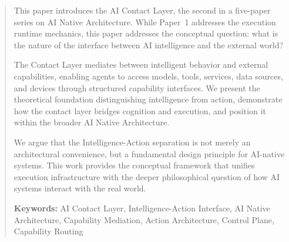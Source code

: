 \begin{abstract}
This paper introduces the AI Contact Layer, the second in a five-paper series on AI Native Architecture. While Paper~1 addresses the execution runtime mechanics, this paper addresses the conceptual question: what is the nature of the interface between AI intelligence and the external world?

The Contact Layer mediates between intelligent behavior and external capabilities, enabling agents to access models, tools, services, data sources, and devices through structured capability interfaces. We present the theoretical foundation distinguishing intelligence from action, demonstrate how the contact layer bridges cognition and execution, and position it within the broader AI Native Architecture.

We argue that the Intelligence-Action separation is not merely an architectural convenience, but a fundamental design principle for AI-native systems. This work provides the conceptual framework that unifies execution infrastructure with the deeper philosophical question of how AI systems interact with the real world.

\vspace{0.5em}
\noindent\textbf{Keywords:} AI Contact Layer, Intelligence-Action Interface, AI Native Architecture, Capability Mediation, Action Architecture, Control Plane, Capability Routing
\end{abstract}
